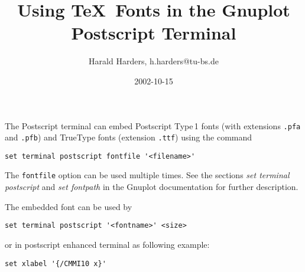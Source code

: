 \documentclass[a4paper,10pt]{article}
\begin{document}
\title{Using \TeX\ Fonts in the Gnuplot Postscript Terminal}
\author{Harald Harders, {\ttfamily h.harders@tu-bs.de}}
\date{2002-10-15}
\maketitle

The Postscript terminal can embed Postscript Type\,1 fonts (with
extensions \verb|.pfa| and \verb|.pfb|) and TrueType fonts (extension
\verb|.ttf|) using the command
\begin{verbatim}
set terminal postscript fontfile '<filename>'
\end{verbatim}
The \verb|fontfile| option can be used multiple times.
See the sections \emph{set terminal postscript} and \emph{set
  fontpath} in the Gnuplot documentation for further description.

The embedded font can be used by 
\begin{verbatim}
set terminal postscript '<fontname>' <size>
\end{verbatim}
or in postscript enhanced terminal as following example:
\begin{verbatim}
set xlabel '{/CMMI10 x}'
\end{verbatim}
\end{document}
